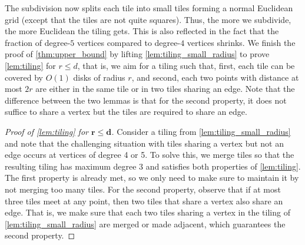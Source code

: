 \documentclass[11pt]{article}
\providecommand{\todo}[2][]{}
\begin{document}
The subdivision now splits each tile into small tiles forming a normal Euclidean grid (except that the tiles are not quite squares).
Thus, the more we subdivide, the more Euclidean the tiling gets.
This is also reflected in the fact that the fraction of degree-$5$ vertices compared to degree-$4$ vertices shrinks.
%
We finish the proof of \cref{thm:upper_bound} by lifting \cref{lem:tiling_small_radius} to prove \cref{lem:tiling} for $ r \leq d $, that is, we aim for a tiling such that, first, each tile can be covered by $ O(1) $ disks of radius $ r $, and second, each two points with distance at most $ 2r $ are either in the same tile or in two tiles sharing an edge.
Note that the difference between the two lemmas is that for the second property, it does not suffice to share a vertex but the tiles are required to share an edge.
%
\begin{proof}[Proof of \cref{lem:tiling} for $ \bm{r \leq d} $]
    Consider a tiling from \cref{lem:tiling_small_radius} and note that the challenging situation with tiles sharing a vertex but not an edge occurs at vertices of degree 4 or 5.
    To solve this, we merge tiles so that the resulting tiling has maximum degree 3 and satisfies both properties of \cref{lem:tiling}.
    The first property is already met, so we only need to make sure to maintain it by not merging too many tiles.
    For the second property, observe that if at most three tiles meet at any point, then two tiles that share a vertex also share an edge.
    That is, we make sure that each two tiles sharing a vertex in the tiling of \cref{lem:tiling_small_radius} are merged or made adjacent, which guarantees the second property.
%

\end{proof}
\end{document}
